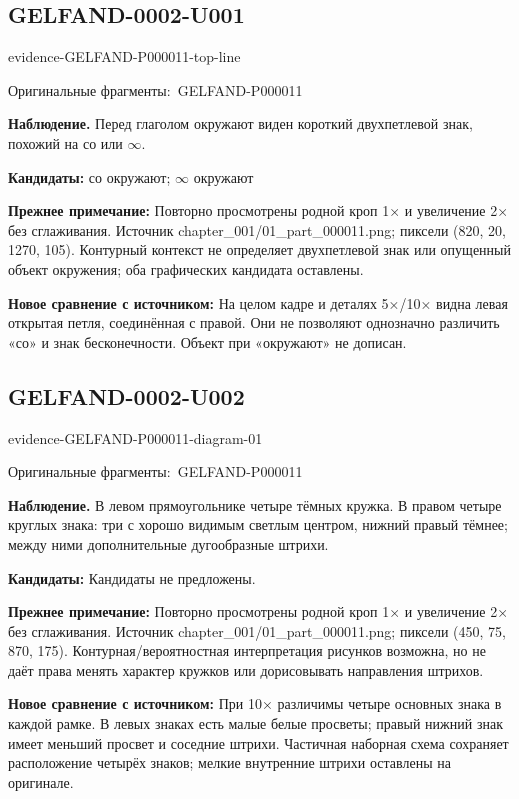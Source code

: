 \documentclass[11pt]{article}
\newcommand{\EvidenceBlock}[4]{%
 \par\smallskip\noindent\begin{minipage}{\linewidth}
 \begin{minipage}[t]{.47\linewidth}\vspace{0pt}\centering
 \csname evidence-#1-#2\endcsname\par
 {\scriptsize\SourceCropCaption\ #1}\par
 \end{minipage}\hfill
 \begin{minipage}[t]{.49\linewidth}\vspace{0pt}\raggedright
 {\small\color{orange!65!black}\textbf{#4} #3}\par
 \end{minipage}
 \end{minipage}\par\smallskip}
\newcommand{\SourceCropCaption}{Оригинальные фрагменты:}\newcommand{\ReadingCaption}{Сомнительное чтение.}\newcommand{\IncompleteCaption}{Неразобранный фрагмент.}\newcommand{\DiagramCaption}{Рисунок и набранное описание.}
\begin{document}
\subsection*{GELFAND-0002-U001}
\EvidenceBlock{GELFAND-P000011}{top-line}{Перед глаголом окружают виден короткий двухпетлевой знак, похожий на со или \(\infty\).}{Наблюдение.}
\par\smallskip\noindent\textbf{Кандидаты: } со окружают; \(\infty\) окружают\par
\par\smallskip\noindent\textbf{Прежнее примечание: } Повторно просмотрены родной кроп 1× и увеличение 2× без сглаживания. Источник chapter\_001/01\_part\_000011.png; пиксели (820, 20, 1270, 105). Контурный контекст не определяет двухпетлевой знак или опущенный объект окружения; оба графических кандидата оставлены.\par
\par\smallskip\noindent\textbf{Новое сравнение с источником: } На целом кадре и деталях 5×/10× видна левая открытая петля, соединённая с правой. Они не позволяют однозначно различить «со» и знак бесконечности. Объект при «окружают» не дописан.\par

\subsection*{GELFAND-0002-U002}
\EvidenceBlock{GELFAND-P000011}{diagram-01}{В левом прямоугольнике четыре тёмных кружка. В правом четыре круглых знака: три с хорошо видимым светлым центром, нижний правый тёмнее; между ними дополнительные дугообразные штрихи.}{Наблюдение.}
\par\smallskip\noindent\textbf{Кандидаты: } Кандидаты не предложены.\par
\par\smallskip\noindent\textbf{Прежнее примечание: } Повторно просмотрены родной кроп 1× и увеличение 2× без сглаживания. Источник chapter\_001/01\_part\_000011.png; пиксели (450, 75, 870, 175). Контурная/вероятностная интерпретация рисунков возможна, но не даёт права менять характер кружков или дорисовывать направления штрихов.\par
\par\smallskip\noindent\textbf{Новое сравнение с источником: } При 10× различимы четыре основных знака в каждой рамке. В левых знаках есть малые белые просветы; правый нижний знак имеет меньший просвет и соседние штрихи. Частичная наборная схема сохраняет расположение четырёх знаков; мелкие внутренние штрихи оставлены на оригинале.\par
\end{document}
